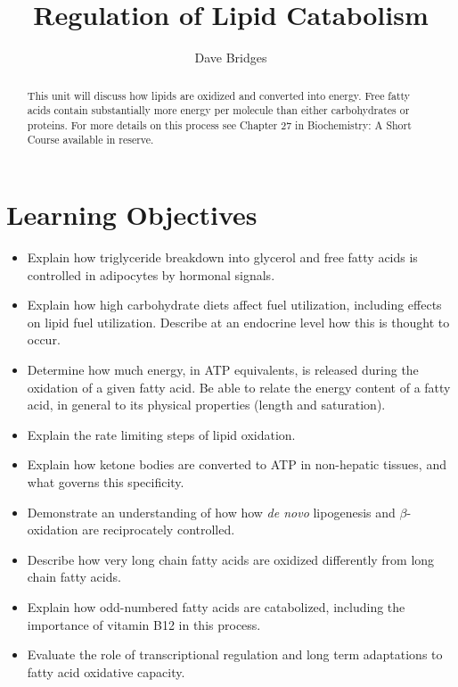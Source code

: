 \documentclass{tufte-handout}
\title{Regulation of Lipid Catabolism}
\author{Dave Bridges}
\begin{document}
\maketitle%

\begin{abstract}
\noindent  This unit will discuss how lipids are oxidized and converted into energy.  Free fatty acids contain substantially more energy per molecule than either carbohydrates or proteins.  For more details on this process see Chapter 27 in Biochemistry: A Short Course available in reserve\cite{Berg2015}.
\end{abstract}

\tableofcontents

\pagebreak
\section{Learning Objectives}

\begin{itemize}
\item Explain how triglyceride breakdown into glycerol and free fatty acids is controlled in adipocytes by hormonal signals.
\item Explain how high carbohydrate diets affect fuel utilization, including effects on lipid fuel utilization.  Describe at an endocrine level how this is thought to occur.
\item Determine how much energy, in ATP equivalents, is released during the oxidation of a given fatty acid.  Be able to relate the energy content of a fatty acid, in general to its physical properties (length and saturation).
\item Explain the rate limiting steps of lipid oxidation.
\item Explain how ketone bodies are converted to ATP in non-hepatic tissues, and what governs this specificity.
\item Demonstrate an understanding of how how \textit{de novo} lipogenesis and $\beta$-oxidation are reciprocately controlled.
\item Describe how very long chain fatty acids are oxidized differently from long chain fatty acids.
\item Explain how odd-numbered fatty acids are catabolized, including the importance of vitamin B12 in this process. 
\item Evaluate the role of transcriptional regulation and long term adaptations to fatty acid oxidative capacity.
\end{itemize}
\end{document}
